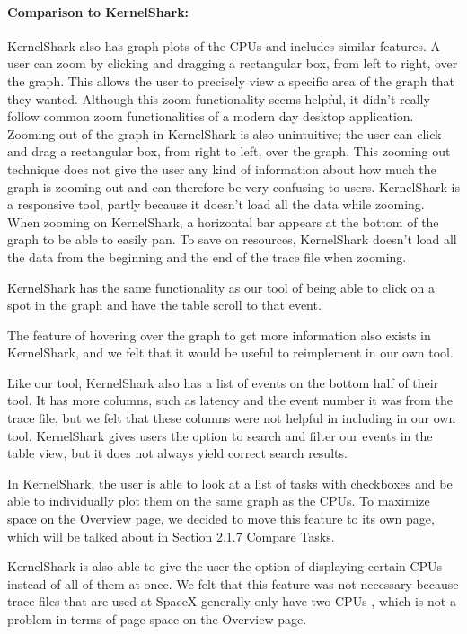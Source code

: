 \documentclass{hmcclinic}
\begin{document}
\paragraph{Comparison to KernelShark:} KernelShark also has graph plots of the CPUs and includes similar features. A user can zoom by clicking and dragging a rectangular box, from left to right, over the graph. This allows the user to precisely view a specific area of the graph that they wanted. Although this zoom functionality seems helpful, it didn't really follow common zoom functionalities of a modern day desktop application. Zooming out of the graph in KernelShark is also unintuitive; the user can click and drag a rectangular box, from right to left, over the graph. This zooming out technique does not give the user any kind of information about how much the graph is zooming out and can therefore be very confusing to users. KernelShark is a responsive tool, partly because it doesn't load all the data while zooming. When zooming on KernelShark, a horizontal bar appears at the bottom of the graph to be able to easily pan. To save on resources, KernelShark doesn't load all the data from the beginning and the end of the trace file when zooming. 
    
     KernelShark has the same functionality as our tool of being able to click on a spot in the graph and have the table scroll to that event. 
    
   The feature of hovering over the graph to get more information also exists in KernelShark, and we felt that it would be useful to reimplement in our own tool.

     Like our tool, KernelShark also has a list of events on the bottom half of their tool. It has more columns, such as latency and the event number it was from the trace file, but we felt that these columns were not helpful in including in our own tool. KernelShark gives users the option to search and filter our events in the table view, but it does not always yield correct search results. 
    
    In KernelShark, the user is able to look at a list of tasks with checkboxes and be able to individually plot them on the same graph as the CPUs. To maximize space on the Overview page, we decided to move this feature to its own page, which will be talked about in Section 2.1.7 Compare Tasks. 
    
    KernelShark is also able to give the user the option of displaying certain CPUs instead of all of them at once. We felt that this feature was not necessary because trace files that are used at SpaceX generally only have two CPUs , which is not a problem in terms of page space on the Overview page.
    
\end{document}
